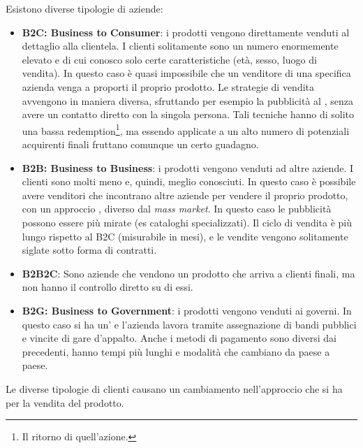 Esistono diverse tipologie di aziende:
\begin{itemize}
  \item \textbf{B2C: Business to Consumer}: i prodotti vengono direttamente
  venduti al dettaglio alla clientela. I clienti solitamente sono un numero
  enormemente elevato e di cui conosco solo certe caratteristiche (età, sesso,
  luogo di vendita). In questo caso è quasi impossibile che un venditore di una
  specifica azienda venga a proporti il proprio prodotto. Le strategie di
  vendita avvengono in maniera diversa, sfruttando per esempio la pubblicità al
  , senza avere un contatto diretto con la singola
  persona.
  Tali tecniche hanno di solito una bassa redemption\footnote{Il ritorno di
  quell'azione.}, ma essendo applicate a un alto numero di potenziali
  acquirenti finali fruttano comunque un certo guadagno.

  \item \textbf{B2B: Business to Business}: i prodotti vengono venduti ad altre
  aziende. I clienti sono molti meno e, quindi, meglio conosciuti. In questo
  caso è possibile avere venditori che incontrano altre aziende per vendere il
  proprio prodotto, con un approccio , diverso dal
  \textit{mass market}. In questo caso le pubblicità possono essere più mirate
  (es cataloghi specializzati). Il ciclo di vendita è più lungo rispetto al B2C
  (misurabile in mesi), e le vendite vengono solitamente siglate sotto forma di
  contratti.

  \item \textbf{B2B2C}: Sono aziende che vendono un prodotto che arriva a
  clienti finali, ma non hanno il controllo diretto su di essi.

  \item \textbf{B2G: Business to Government}: i prodotti vengono venduti ai
  governi. In questo caso si ha un' e l'azienda lavora tramite assegnazione di bandi pubblici e
  vincite di gare d'appalto. Anche i metodi di pagamento sono diversi dai
  precedenti, hanno tempi più lunghi e modalità che cambiano da paese a paese.
\end{itemize}

Le diverse tipologie di clienti causano un cambiamento nell'approccio che si ha
per la vendita del prodotto.
